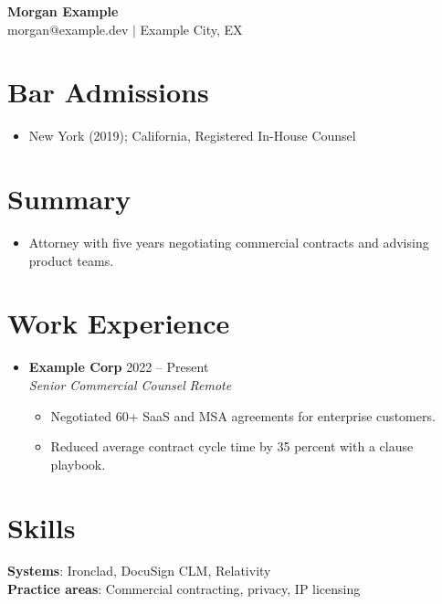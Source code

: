 \documentclass[letterpaper,11pt]{article}
\newcommand{\resumeItem}[1]{\item\small{#1}}
\newcommand{\resumeSubheading}[4]{%
  \item
  \textbf{#1} \hfill #2 \\
  \textit{#3} \hfill \textit{#4}%
}
\newcommand{\resumeItemListStart}{\begin{itemize}[leftmargin=0.15in]}
\newcommand{\resumeItemListEnd}{\end{itemize}}
\begin{document}
\begin{center}
  {\LARGE\bfseries Morgan Example}\\[2pt]
  \small morgan@example.dev $|$ Example City, EX
\end{center}

\section{Bar Admissions}
\resumeItemListStart
  \resumeItem{New York (2019); California, Registered In-House Counsel}
\resumeItemListEnd

\section{Summary}
\resumeItemListStart
  \resumeItem{Attorney with five years negotiating commercial contracts and advising product teams.}
\resumeItemListEnd

\section{Work Experience}
\resumeItemListStart
  \resumeSubheading{Example Corp}{2022 -- Present}{Senior Commercial Counsel}{Remote}
  \resumeItemListStart
    \resumeItem{Negotiated 60+ SaaS and MSA agreements for enterprise customers.}
    \resumeItem{Reduced average contract cycle time by 35 percent with a clause playbook.}
  \resumeItemListEnd
\resumeItemListEnd

\section{Skills}
\begin{itemize}[leftmargin=0.15in]
  \small{\item{
    \textbf{Systems}{: Ironclad, DocuSign CLM, Relativity} \\
    \textbf{Practice areas}{: Commercial contracting, privacy, IP licensing} \\
  }}
\end{itemize}
\end{document}
